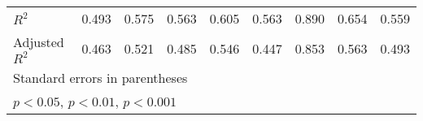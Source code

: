 {\begin{tabular}{l*{8}{c}}
\(R^{2}\)           &       0.493         &       0.575         &       0.563         &       0.605         &       0.563         &       0.890         &       0.654         &       0.559         \\
Adjusted \(R^{2}\)  &       0.463         &       0.521         &       0.485         &       0.546         &       0.447         &       0.853         &       0.563         &       0.493         \\
\bottomrule
\multicolumn{9}{l}{\footnotesize Standard errors in parentheses}\\
\multicolumn{9}{l}{\footnotesize \sym{*} \(p<0.05\), \sym{**} \(p<0.01\), \sym{***} \(p<0.001\)}\\
\end{tabular}
}
